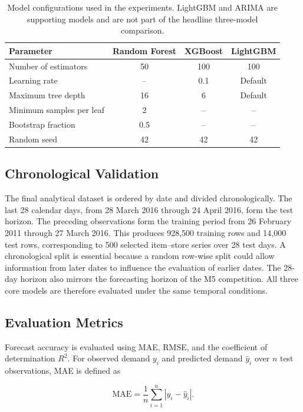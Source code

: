 \begin{table}[!t]
\centering
\caption{Model configurations used in the experiments. LightGBM and ARIMA are supporting models and are not part of the headline three-model comparison.}
\label{tab:models}
\begin{tabular}{lccc}
\toprule
\textbf{Parameter} & \textbf{Random Forest} & \textbf{XGBoost} & \textbf{LightGBM} \\
\midrule
Number of estimators & 50 & 100 & 100 \\
Learning rate & -- & 0.1 & Default \\
Maximum tree depth & 16 & 6 & Default \\
Minimum samples per leaf & 2 & -- & -- \\
Bootstrap fraction & 0.5 & -- & -- \\
Random seed & 42 & 42 & 42 \\
\bottomrule
\end{tabular}
\end{table}

\subsection{Chronological Validation}

The final analytical dataset is ordered by date and divided chronologically.
The last 28 calendar days, from 28 March 2016 through 24 April 2016, form the test horizon.
The preceding observations form the training period from 26 February 2011 through 27 March 2016.
This produces 928,500 training rows and 14,000 test rows, corresponding to 500 selected item--store series over 28 test days.
A chronological split is essential because a random row-wise split could allow information from later dates to influence the evaluation of earlier dates.
The 28-day horizon also mirrors the forecasting horizon of the M5 competition.
All three core models are therefore evaluated under the same temporal conditions.

\subsection{Evaluation Metrics}

Forecast accuracy is evaluated using MAE, RMSE, and the coefficient of determination $R^2$.
For observed demand $y_i$ and predicted demand $\hat{y}_i$ over $n$ test observations, MAE is defined as

\begin{equation}
\mathrm{MAE}
=
\frac{1}{n}\sum_{i=1}^{n}|y_i-\hat{y}_i|.
\label{eq:mae}
\end{equation}

